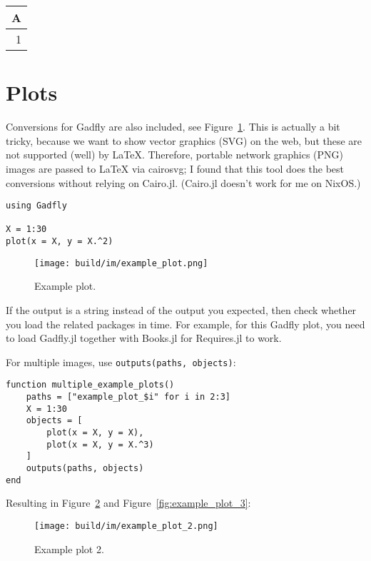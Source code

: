 \documentclass[
  14pt
  american,
  paper=a4,
  ,captions=tableheading
]{scrreprt}
\newcommand{\passthrough}[1]{#1}
\begin{document}
\begin{longtable}[]{@{}r@{}}
\toprule
A\tabularnewline
\midrule
\endhead
1\tabularnewline
\bottomrule
\end{longtable}

\hypertarget{sec:plots}{%
\section{Plots}\label{sec:plots}}

Conversions for Gadfly are also included, see
Figure~\ref{fig:example_plot}. This is actually a bit tricky, because we
want to show vector graphics (SVG) on the web, but these are not
supported (well) by LaTeX. Therefore, portable network graphics (PNG)
images are passed to LaTeX via cairosvg; I found that this tool does the
best conversions without relying on Cairo.jl. (Cairo.jl doesn't work for
me on NixOS.)

\begin{lstlisting}
using Gadfly

X = 1:30
plot(x = X, y = X.^2)
\end{lstlisting}

\begin{figure}
\hypertarget{fig:example_plot}{%
\centering
\texttt{[image: build/im/example\_plot.png]}
\caption{Example plot.}\label{fig:example_plot}
}
\end{figure}

If the output is a string instead of the output you expected, then check
whether you load the related packages in time. For example, for this
Gadfly plot, you need to load Gadfly.jl together with Books.jl for
Requires.jl to work.

For multiple images, use
\passthrough{\lstinline!outputs(paths, objects)!}:

\begin{lstlisting}
function multiple_example_plots()
    paths = ["example_plot_$i" for i in 2:3]
    X = 1:30
    objects = [
        plot(x = X, y = X),
        plot(x = X, y = X.^3)
    ]
    outputs(paths, objects)
end
\end{lstlisting}

Resulting in Figure~\ref{fig:example_plot_2} and
Figure~\ref{fig:example_plot_3}:

\begin{figure}
\hypertarget{fig:example_plot_2}{%
\centering
\texttt{[image: build/im/example\_plot\_2.png]}
\caption{Example plot 2.}\label{fig:example_plot_2}
}
\end{figure}
\end{document}
